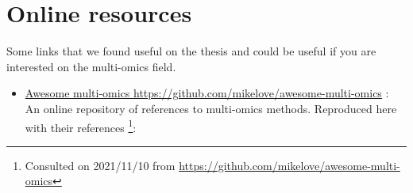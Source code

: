 \documentclass[
  12pt,
  a4paper,
  twoside,
  openright]{book}
\providecommand{\tightlist}{%
  \setlength{\itemsep}{0pt}\setlength{\parskip}{0pt}}
\newcounter{chapshift}
\begin{document}
\afterpage{\setcounter{chapshift}{0}}

\hypertarget{appendix-appendix}{%
\appendix {}}


\hypertarget{online-resources}{%
\chapter{Online resources}\label{online-resources}}

Some links that we found useful on the thesis and could be useful if you are interested on the multi-omics field.

\begin{itemize}
\tightlist
\item
  \href{https://github.com/mikelove/awesome-multi-omics}{Awesome multi-omics https://github.com/mikelove/awesome-multi-omics} : An online repository of references to multi-omics methods. Reproduced here with their references \footnote{Consulted on 2021/11/10 from \url{https://github.com/mikelove/awesome-multi-omics}}:
\end{itemize}
\end{document}
